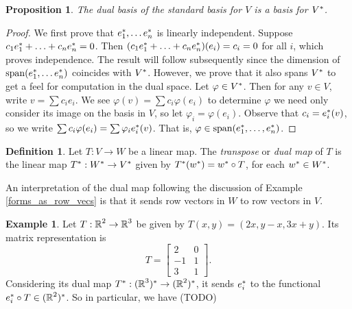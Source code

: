 \documentclass[12pt]{article}
\theoremstyle{definition}
\newtheorem{definition}{Definition}[section]
\newtheorem{example}{Example}[section]
\theoremstyle{plain}
\newtheorem{proposition}[theorem] {Proposition}
\numberwithin{equation}{section}
\theoremstyle{definition}
\begin{document}
\begin{proposition}
The dual basis of the standard basis for $ V $ is a basis for $ V^{*} $.
\end{proposition}

\begin{proof}
We first prove that $ e_1^{*}, \ldots e_n^{*} $ is linearly independent. Suppose $ c_1 e_1^{*} + \ldots + c_n e_n^{*} = 0 $. Then $(c_1 e_1^{*} + \ldots + c_n e_n^{*})(e_i) = c_i = 0  $ for all $ i $, which proves independence. The result will follow subsequently since the dimension of $ \operatorname{span}(e_1^{*}, \ldots e_n^{*}) $ coincides with $ V^{*} $. However, we prove that it also spans $ V^{*} $ to get a feel for computation in the dual space.
Let $ \varphi \in V^{*}$. Then for any $ v \in V $, write $ v = \sum c_i e_i $. We see $ \varphi(v) = \sum c_i \varphi(e_i) $ to determine $ \varphi $ we need only consider its image on the basis in $ V $, so let $ \varphi_i = \varphi(e_i) $. Observe that $ c_i = e^{*}_i(v) $, so we write $ \sum c_i \varphi(e_i) = \sum \varphi_i e^{*}_i(v) $. That is, $ \varphi \in \operatorname{span}(e_1^{*}, \ldots, e_n^{*}) $.
\end{proof}

\begin{definition}
Let $ T : V \to W $ be a linear map. The \textit{transpose} or \textit{dual map} of $ T $ is the linear map $ T^{*} : W^{*} \to V^{*} $ given by $ T^{*}(w^{*}) = w^{*} \circ T $, for each $ w^{*} \in W^{*} $.
\end{definition}

An interpretation of the dual map following the discussion of Example \ref{forms_as_row_vecs} is that it sends row vectors in $ W $ to row vectors in $ V $.

\begin{example}
Let $ T: \operatorname{\mathbb{R}}^2 \to \operatorname{\mathbb{R}}^3 $ be given by $ T(x, y) = (2x, y - x, 3x + y) $. Its matrix representation is
\[T = \begin{bmatrix}
	 2 & 0\\
	-1 & 1\\
	 3 & 1 
\end{bmatrix}. \]
Considering its dual map $ T^{*} : (\operatorname{\mathbb{R}}^3)^{*} \to (\operatorname{\mathbb{R}}^2)^{*} $, it sends $ e_i^{*} $ to the functional $ e_i^{*} \circ T \in (\operatorname{\mathbb{R}}^2) ^{*} $. So in particular, we have
(TODO)
\begin{align*}
\end{align*}
	
\end{example}
\end{document}

